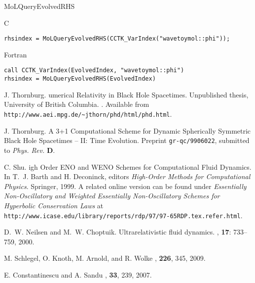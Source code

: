 \begin{FunctionDescription}{MoLQueryEvolvedRHS}
  \begin{ExampleSection}
    \begin{Example}{C}
\begin{verbatim}
rhsindex = MoLQueryEvolvedRHS(CCTK_VarIndex("wavetoymol::phi"));
\end{verbatim}
    \end{Example}
    \begin{Example}{Fortran}
\begin{verbatim}
call CCTK_VarIndex(EvolvedIndex, "wavetoymol::phi")
rhsindex = MoLQueryEvolvedRHS(EvolvedIndex)
\end{verbatim}
    \end{Example}
  \end{ExampleSection}

\end{FunctionDescription}



\begin{thebibliography}{9}

J. Thornburg.
umerical {R}elativity in {B}lack {H}ole {S}pacetimes. 
\newblock Unpublished thesis, University of British Columbia.
.
\newblock Available from \mbox{\tt
  http://www.aei.mpg.de/\~{}jthorn/phd/html/phd.html}. 

J. Thornburg.
\newblock A {3+1} {C}omputational {S}cheme for {D}ynamic {S}pherically
{S}ymmetric {B}lack {H}ole {S}pacetimes -- {II}: {T}ime {E}volution.
\newblock Preprint {\tt gr-qc/9906022}, submitted to {\em Phys. Rev.}
{\bf D}. 

C. Shu.
igh {O}rder {ENO} and {WENO} {S}chemes for
{C}omputational {F}luid {D}ynamics.
\newblock In T.~J. Barth and H. Deconinck, editors {\em High-Order
  Methods for Computational Physics}. Springer, 1999.
\newblock A related online version can be found under {\em Essentially
  {N}on-{O}scillatory and {W}eighted {E}ssentially {N}on-{O}scillatory
  {S}chemes for {H}yperbolic {C}onservation {L}aws} at {\tt
  http://www.icase.edu/library/reports/rdp/97/97-65RDP.tex.refer.html}. 

D.~W. Neilsen and M.~W. Choptuik.
\newblock Ultrarelativistic fluid dynamics.
, {\bf 17}: 733--759, 2000.

M. Schlegel, O. Knoth, M. Arnold, and R. Wolke
, {\bf 226}, 345, 2009.

E. Constantinescu and A. Sandu
, {\bf 33}, 239, 2007.

\end{thebibliography}



